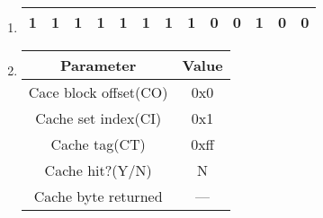 \documentclass{article}
\begin{document}
\begin{enumerate}[label=\textbf{\Alph*.}]
	\item 
\begin{tabular}{|c|c|c|c|c|c|c|c|c|c|c|c|c|}
	\hline
	1&1&1&1&1&1&1&1&0&0&1&0&0 \\
	\hline
\end{tabular}
	\item
	\begin{tabular}{c c}
		Parameter & Value \\
		\hline
		Cace block offset(CO) & 0x0 \\
		Cache set index(CI) & 0x1\\
		Cache tag(CT) & 0xff \\
		Cache hit?(Y/N) & N \\
		Cache byte returned & --- \\
	\end{tabular}
\end{enumerate}
\end{document}
